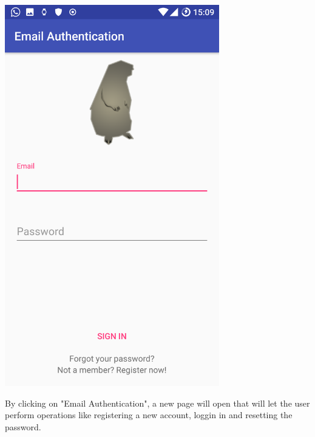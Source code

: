 \documentclass[a4paper]{scrreprt}
\begin{document}
\begin{minipage}{0.5\textwidth}
	\centering
	\includegraphics[width=0.7\textwidth]{imgs/authentication_email}
\end{minipage}
\begin{minipage}{0.5\textwidth}
	By clicking on "Email Authentication", a new page will open that will let the user perform operations like registering a new account, loggin in and resetting the password. 
\end{minipage}
\end{document}
